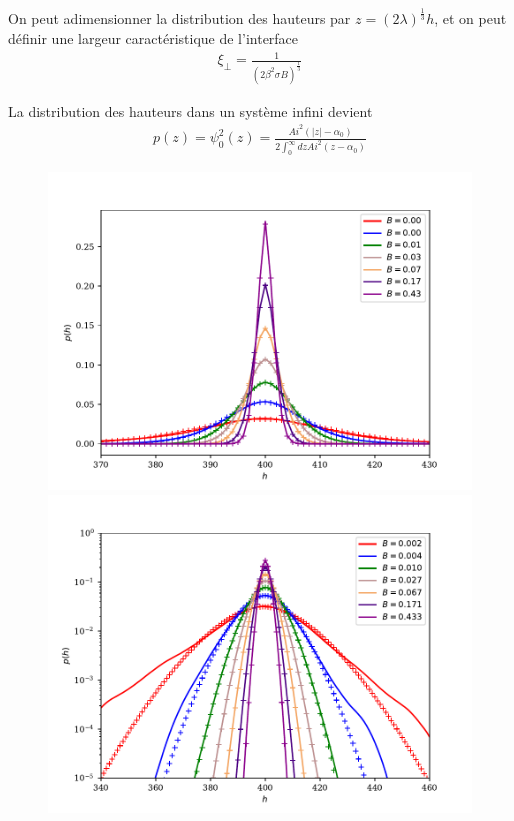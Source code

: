 On peut adimensionner la distribution des hauteurs par $z = (2\lambda)^\frac{1}{3}h$, et on peut définir une largeur caractéristique de l'interface 
\begin{align}
	\xi_\perp = \frac{1}{(2\beta^2 \sigma B)^\frac{1}{3}}
	\label{xi_perp}
\end{align}


La distribution des hauteurs dans un système infini devient 
\begin{align}
	p(z) = \psi_0^2(z) = \frac{ Ai^2 ( |z|-\alpha_0 )}{ 2 \int_0^\infty dz Ai^2 ( z-\alpha_0 ) }
	\label{airy}
\end{align}
	
\begin{figure}[h]
	\begin{minipage}[t]{0.5\linewidth}
		\includegraphics[width=\linewidth]{sosequi-laser/histo.pdf}
	\end{minipage}%
	\begin{minipage}[t]{0.5\linewidth}
		\includegraphics[width=\linewidth]{sosequi-laser/loghisto.pdf}

\end{minipage}
\end{figure}
